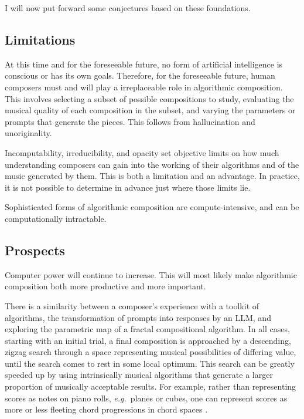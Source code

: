 \documentclass[11pt,papersize=a4]{scrartcl}
\begin{document}
I will now put forward some conjectures based on these foundations.

\subsection*{Limitations}

At this time and for the foreseeable future, no form of artificial intelligence is conscious or has its own goals. Therefore, for the foreseeable future, human composers must and will play a irreplaceable role in algorithmic composition. This involves selecting a subset of possible compositions to study, evaluating the musical quality of each composition in the subset, and varying the parameters or prompts that generate the pieces. This follows from hallucination and unoriginality.

Incomputability, irreducibility, and opacity set objective limits on how much understanding composers can gain into the working of their algorithms and of the music generated by them. This is both a limitation and an advantage. In practice, it is not possible to determine in advance just where those limits lie.

Sophisticated forms of algorithmic composition are compute-intensive, and can be computationally intractable.

\subsection*{Prospects}

Computer power will continue to increase. This will most likely make algorithmic composition both more productive and more important.

There is a similarity between a composer's experience with a toolkit of algorithms, the transformation of prompts into responses by an LLM, and exploring the parametric map of a fractal compositional algorithm. In all cases, starting with an initial trial, a final composition is approached by a descending, zigzag search through a space representing musical possibilities of differing value, until the search comes to rest in some local optimum. This search can be greatly speeded up by using intrinsically musical algorithms that generate a larger proportion of musically acceptable results. For example, rather than representing scores as notes on piano rolls, \emph{e.g.}\ planes or cubes, one can represent scores as more or less fleeting chord progressions in chord spaces \parencite{gogins2006score, gogins2023scoregraphs}.
\end{document}
